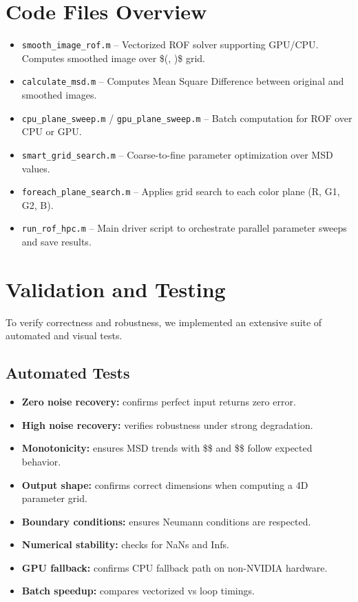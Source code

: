 \documentclass[11pt]{article}
\begin{document}
\section{Code Files Overview}
\begin{itemize}
\item \texttt{smooth\_image\_rof.m} -- Vectorized ROF solver supporting GPU/CPU. Computes smoothed image over \$(\lambda, \epsilon)\$ grid.
\item \texttt{calculate\_msd.m} -- Computes Mean Square Difference between original and smoothed images.
\item \texttt{cpu\_plane\_sweep.m} / \texttt{gpu\_plane\_sweep.m} -- Batch computation for ROF over CPU or GPU.
\item \texttt{smart\_grid\_search.m} -- Coarse-to-fine parameter optimization over MSD values.
\item \texttt{foreach\_plane\_search.m} -- Applies grid search to each color plane (R, G1, G2, B).
\item \texttt{run\_rof\_hpc.m} -- Main driver script to orchestrate parallel parameter sweeps and save results.
\end{itemize}

\section{Validation and Testing}
To verify correctness and robustness, we implemented an extensive suite of automated and visual tests.

\subsection{Automated Tests}
\begin{itemize}
\item \textbf{Zero noise recovery:} confirms perfect input returns zero error.
\item \textbf{High noise recovery:} verifies robustness under strong degradation.
\item \textbf{Monotonicity:} ensures MSD trends with \$\lambda\$ and \$\epsilon\$ follow expected behavior.
\item \textbf{Output shape:} confirms correct dimensions when computing a 4D parameter grid.
\item \textbf{Boundary conditions:} ensures Neumann conditions are respected.
\item \textbf{Numerical stability:} checks for NaNs and Infs.
\item \textbf{GPU fallback:} confirms CPU fallback path on non-NVIDIA hardware.
\item \textbf{Batch speedup:} compares vectorized vs loop timings.
\end{itemize}
\end{document}
